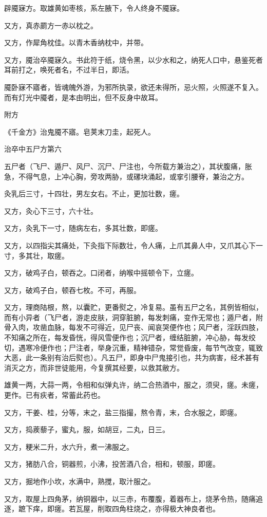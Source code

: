 \documentclass[12pt,UTF8]{ctexbook}
\begin{document}
辟魇寐方。取雄黄如枣核，系左腋下，令人终身不魇寐。

又方，真赤罽方一赤以枕之。

又方，作犀角枕佳。以青木香纳枕中，并带。

又方，魇治卒魇寐久。书此符于纸，烧令黑，以少水和之，纳死人口中，悬鉴死者耳前打之，唤死者名，不过半日，即活。

魇卧寐不寤者，皆魂魄外游，为邪所执录，欲还未得所，忌火照，火照遂不复入。而有灯光中魇者，是本由明出，但不反身中故耳。

附方

《千金方》治鬼魇不寤。皂荚末刀圭，起死人。

治卒中五尸方第六

五尸者（飞尸、遁尸、风尸、沉尸、尸注也，今所载方兼治之），其状腹痛，胀急，不得气息，上冲心胸，旁攻两胁，或磥块涌起，或挛引腰脊，兼治之方。

灸乳后三寸，十四壮，男左女右。不止，更加壮数，瘥。

又方，灸心下三寸，六十壮。

又方，灸乳下一寸，随病左右，多其壮数，即瘥。

又方，以四指尖其痛处，下灸指下际数壮，令人痛，上爪其鼻人中，又爪其心下一寸，多其壮，取瘥。

又方，破鸡子白，顿吞之。口闭者，纳喉中摇顿令下，立瘥。

又方，破鸡子白，顿吞七枚。不可，再服。

又方，理商陆根，熬，以囊贮，更番熨之，冷复易。虽有五尸之名，其例皆相似，而有小异者（飞尸者，游走皮肤，洞穿脏腑，每发刺痛，变作无常也；遁尸者，附骨入肉，攻凿血脉，每发不可得近，见尸丧、闻哀哭便作也；风尸者，淫跃四肢，不知痛之所在，每发昏恍，得风雪便作也；沉尸者，缠结脏腑，冲心胁，每发绞切，遇寒冷便作也；尸注者，举身沉重，精神错杂，常觉昏废，每节气改变，辄致大恶，此一条别有治后熨也）。凡五尸，即身中尸鬼接引也，共为病害，经术甚有消灭之方，而非世徒能用，今复撰其经要，以救其敝方。

雄黄一两，大蒜一两，令相和似弹丸许，纳二合热酒中，服之，须臾，瘥。未瘥，更作。已有疢者，常蓄此药也。

又方，干姜、桂，分等，末之，盐三指撮，熬令青，末，合水服之，即瘥。

又方，捣蒺藜子，蜜丸，服，如胡豆，二丸，日三。

又方，粳米二升，水六升，煮一沸服之。

又方，猪肪八合，铜器煎，小沸，投苦酒八合，相和，顿服，即瘥。

又方，掘地作小坎，水满中，熟搅，取汁服之。

又方，取屋上四角茅，纳铜器中，以三赤，布覆腹，着器布上，烧茅令热，随痛追逐，蹠下痒，即瘥。若瓦屋，削取四角柱烧之，亦得极大神良者也。
\end{document}
